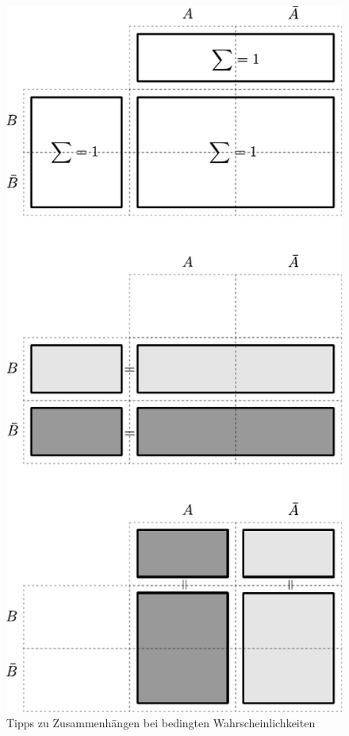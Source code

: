 \begin{figure}[h!]
        \centering
        \includegraphics[scale=\graphscalesmall]{bedingte-wahrscheinlichkeit-tipps.pdf}
        \caption{Tipps zu Zusammenhängen bei bedingten Wahrscheinlichkeiten}
\end{figure}

